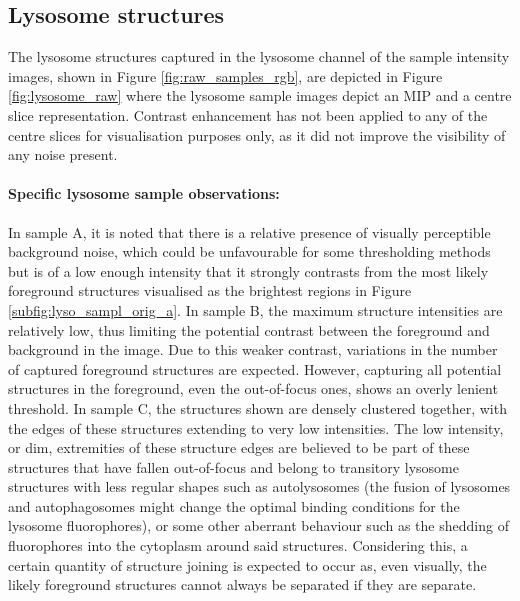 \subsection{Lysosome structures}
The lysosome structures captured in the lysosome channel of the sample intensity images, shown in Figure \ref{fig:raw_samples_rgb}, are depicted in Figure \ref{fig:lysosome_raw} where the lysosome sample images depict an MIP and a centre slice representation. Contrast enhancement has not been applied to any of the centre slices for visualisation purposes only, as it did not improve the visibility of any noise present. \paragraph{Specific lysosome sample observations:} In sample A, it is noted that there is a relative presence of visually perceptible background noise, which could be unfavourable for some thresholding methods but is of a low enough intensity that it strongly contrasts from the most likely foreground structures visualised as the brightest regions in Figure \ref{subfig:lyso_sampl_orig_a}. In sample B, the maximum structure intensities are relatively low, thus limiting the potential contrast between the foreground and background in the image. Due to this weaker contrast, variations in the number of captured foreground structures are expected. However, capturing all potential structures in the foreground, even the out-of-focus ones, shows an overly lenient threshold. In sample C, the structures shown are densely clustered together, with the edges of these structures extending to very low intensities. The low intensity, or dim, extremities of these structure edges are believed to be part of these structures that have fallen out-of-focus and belong to transitory lysosome structures with less regular shapes such as autolysosomes (the fusion of lysosomes and autophagosomes might change the optimal binding conditions for the lysosome fluorophores), or some other aberrant behaviour such as the shedding of fluorophores into the cytoplasm around said structures. Considering this, a certain quantity of structure joining is expected to occur as, even visually, the likely foreground structures cannot always be separated if they are separate.

